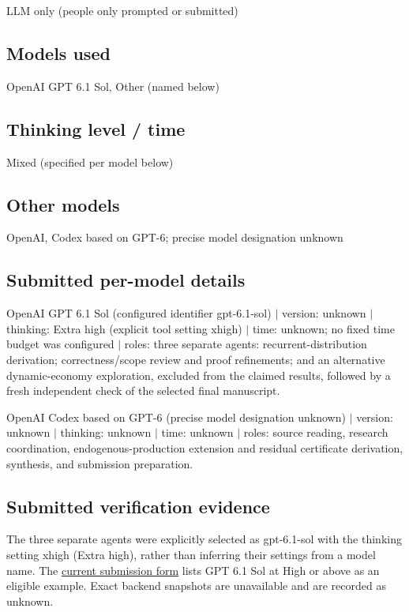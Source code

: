 \documentclass{article}
\begin{document}
LLM only (people only prompted or submitted)

\subsection{Models used}

OpenAI GPT 6.1 Sol, Other (named below)

\subsection{Thinking level / time}

Mixed (specified per model below)

\subsection{Other models}

OpenAI, Codex based on GPT-6; precise model designation unknown

\subsection{Submitted per-model details}

OpenAI GPT 6.1 Sol (configured identifier gpt-6.1-sol) \(\vert\) version: unknown \(\vert\) thinking: Extra high (explicit tool setting xhigh) \(\vert\) time: unknown; no fixed time budget was configured \(\vert\) roles: three separate agents: recurrent-distribution derivation; correctness/scope review and proof refinements; and an alternative dynamic-economy exploration, excluded from the claimed results, followed by a fresh independent check of the selected final manuscript.

OpenAI Codex based on GPT-6 (precise model designation unknown) \(\vert\) version: unknown \(\vert\) thinking: unknown \(\vert\) time: unknown \(\vert\) roles: source reading, research coordination, endogenous-production extension and residual certificate derivation, synthesis, and submission preparation.

\subsection{Submitted verification evidence}

The three separate agents were explicitly selected as gpt-6.1-sol with the thinking setting xhigh (Extra high), rather than inferring their settings from a model name. The \href{https://raw.githubusercontent.com/we-solve/research/main/.github/ISSUE_TEMPLATE/attempt.yml}{current submission form} lists GPT 6.1 Sol at High or above as an eligible example. Exact backend snapshots are unavailable and are recorded as unknown.
\end{document}
